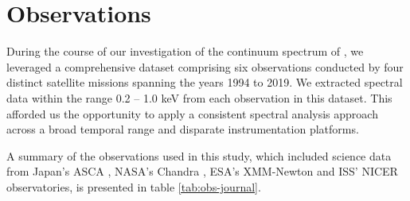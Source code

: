 \section{Observations}
	During the course of our investigation of the continuum spectrum of \source, we leveraged a comprehensive dataset comprising six observations conducted by four distinct satellite missions spanning the years 1994 to 2019. We extracted spectral data within the range 0.2 -- 1.0 keV from each observation in this dataset. This afforded us the opportunity to apply a consistent spectral analysis approach across a broad temporal range and disparate instrumentation platforms.
		
	A summary of the observations used in this study, which included science data from Japan's ASCA \cite{ebisawaAsca2001ApJ}, NASA's Chandra \cite{beardaChandra2002AA}, ESA's XMM-Newton \cite{motchXmmNewton2002AA} and ISS' NICER \cite{orioNicer2022ApJ} observatories, is presented in table \ref{tab:obs-journal}. %

